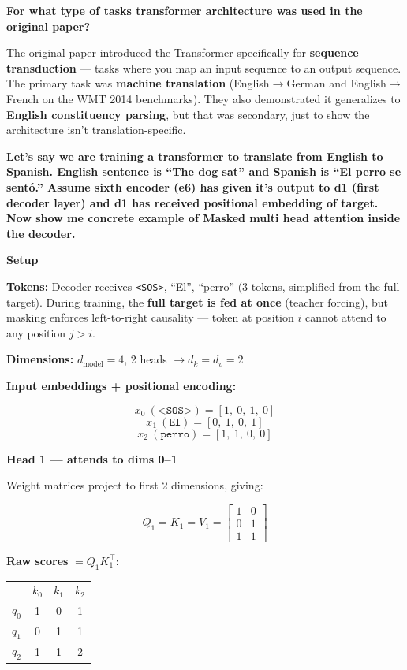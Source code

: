 \bigskip

\textbf{For what type of tasks transformer architecture was used in the original paper?}

The original paper introduced the Transformer specifically for \textbf{sequence transduction} --- tasks where you map an input sequence to an output sequence. The primary task was \textbf{machine translation} (English$\to$German and English$\to$French on the WMT 2014 benchmarks). They also demonstrated it generalizes to \textbf{English constituency parsing}, but that was secondary, just to show the architecture isn't translation-specific.

\bigskip

\textbf{Let's say we are training a transformer to translate from English to Spanish. English sentence is ``The dog sat'' and Spanish is ``El perro se sent\'{o}.'' Assume sixth encoder (e6) has given it's output to d1 (first decoder layer) and d1 has received positional embedding of target. Now show me concrete example of Masked multi head attention inside the decoder.}

\noindent\textbf{Setup}

\noindent\textbf{Tokens:} Decoder receives \texttt{<SOS>}, ``El'', ``perro'' (3 tokens, simplified from the full target).
During training, the \textbf{full target is fed at once} (teacher forcing), but masking enforces left-to-right causality --- token at position $i$ cannot attend to any position $j > i$.

\noindent\textbf{Dimensions:} $d_{\text{model}} = 4$, 2 heads $\to d_k = d_v = 2$

\noindent\textbf{Input embeddings + positional encoding:}

\[
x_0\ (\texttt{<SOS>}) = [1,\ 0,\ 1,\ 0]
\]
\[
x_1\ (\texttt{El}) = [0,\ 1,\ 0,\ 1]
\]
\[
x_2\ (\texttt{perro}) = [1,\ 1,\ 0,\ 0]
\]

\medskip
\noindent\textbf{Head 1 --- attends to dims 0--1}

Weight matrices project to first 2 dimensions, giving:

\[
Q_1 = K_1 = V_1 = \begin{bmatrix}1 & 0\\0 & 1\\1 & 1\end{bmatrix}
\]

\noindent\textbf{Raw scores} $= Q_1 K_1^\top$:

\begin{center}
\begin{tabular}{c|ccc}
 & $k_0$ & $k_1$ & $k_2$ \\
$q_0$ & 1 & 0 & 1 \\
$q_1$ & 0 & 1 & 1 \\
$q_2$ & 1 & 1 & 2 \\
\end{tabular}
\end{center}

